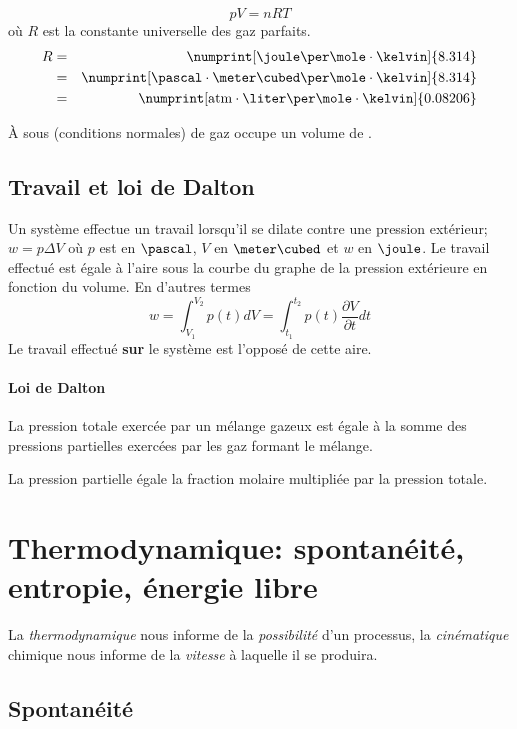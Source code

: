\[ pV = nRT \]
où $R$ est la constante universelle des gaz parfaits.
\begin{eqnarray*}
  R &=& \numprint[\joule\per\mole\cdot\kelvin]{8.314}\\
       &=& \numprint[\pascal\cdot\meter\cubed\per\mole\cdot\kelvin]{8.314}\\
          &=& \numprint[\atm\cdot\liter\per\mole\cdot\kelvin]{0.08206}
\end{eqnarray*}

\`A  sous  (conditions normales)  de gaz occupe un volume de .

\subsection{Travail et loi de Dalton}

Un système effectue un travail lorsqu'il se dilate contre une pression extérieur; $w=p\Delta V$
où $p$ est en $\pascal$, $V$ en $\meter\cubed$ et $w$ en $\joule$.
Le travail effectué est égale à l'aire sous la courbe du graphe de la pression extérieure en fonction du volume.
En d'autres termes
\[ w = \int_{V_1}^{V_2} p(t) dV = \int_{t_1}^{t_2} p(t) \frac{\partial V}{\partial t} dt \]
Le travail effectué \textbf{sur} le système est l'opposé de cette aire.

\paragraph{Loi de Dalton} La pression totale exercée par un mélange gazeux est égale à la somme des pressions partielles exercées par les gaz formant le mélange.

La pression partielle égale la fraction molaire multipliée par la pression totale.

\section{Thermodynamique: spontanéité, entropie, énergie libre}

La \emph{thermodynamique} nous informe de la \emph{possibilité} d'un processus,
la \emph{cinématique} chimique nous informe de la \emph{vitesse} à laquelle il se produira.

\subsection{Spontanéité}

